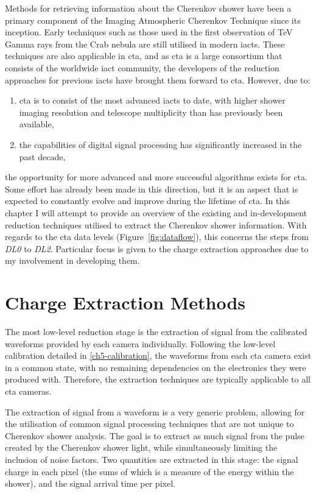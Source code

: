 Methods for retrieving information about the Cherenkov shower have been a primary component of the Imaging Atmospheric Cherenkov Technique since its inception. Early techniques such as those used in the first observation of TeV Gamma rays from the Crab nebula \cite{Weekes1989} are still utilised in modern \glspl{iact}. These techniques are also applicable in \gls{cta}, and as \gls{cta} is a large consortium that consists of the worldwide \gls{iact} community, the developers of the reduction approaches for previous \glspl{iact} have brought them forward to \gls{cta}. However, due to:
\begin{enumerate}[label=(\alph*)]
	\item \gls{cta} is to consist of the most advanced \glspl{iact} to date, with higher shower imaging resolution and telescope multiplicity than has previously been available,
	\item the capabilities of digital signal processing has significantly increased in the past decade,
\end{enumerate}
the opportunity for more advanced and more successful algorithms exists for \gls{cta}. Some effort has already been made in this direction, but it is an aspect that is expected to constantly evolve and improve during the lifetime of \gls{cta}. In this chapter I will attempt to provide an overview of the existing and in-development reduction techniques utilised to extract the Cherenkov shower information. With regards to the \gls{cta} data levels (Figure~\ref{fig:dataflow}), this concerns the steps from \textit{DL0} to \textit{DL2}. Particular focus is given to the charge extraction approaches due to my involvement in developing them.

\section{Charge Extraction Methods}

The most low-level reduction stage is the extraction of signal from the calibrated waveforms provided by each camera individually. Following the low-level calibration detailed in \ref{ch5-calibration}, the waveforms from each \gls{cta} camera exist in a common state, with no remaining dependencies on the electronics they were produced with. Therefore, the extraction techniques are typically applicable to all \gls{cta} cameras. 

The extraction of signal from a waveform is a very generic problem, allowing for the utilisation of common signal processing techniques that are not unique to Cherenkov shower analysis. The goal is to extract as much signal from the pulse created by the Cherenkov shower light, while simultaneously limiting the inclusion of noise factors. Two quantities are extracted in this stage: the signal charge in each pixel (the sums of which is a measure of the energy within the shower), and the signal arrival time per pixel. 


